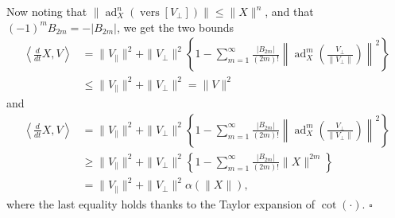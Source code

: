\documentclass[11pt]{article}
\newcommand{\ad}{\operatorname{ad}}
\newcommand{\vers}{\operatorname{vers}}
\newcommand{\proofbox}{\hfill$\square$}
\begin{document}
Now noting that $\|\ad_X^n(\vers[V_{\perp}])\|\leq\|X\|^n$, and that $(-1)^mB_{2m}=-|B_{2m}|$, we get the two bounds
\begin{align*}
\left\langle\frac{d}{dt}X,V\right\rangle
&=\|V_{\parallel}\|^2+\|V_{\perp}\|^2
\left\{1-\sum_{m=1}^{\infty}\frac{|B_{2m}|}{(2m)!}
\left\|\ad_X^m\left(\frac{V_{\perp}}{\|V_{\perp}\|}\right)\right\|^2\right\}\\
&\leq\|V_{\parallel}\|^2+\|V_{\perp}\|^2=\|V\|^2
\end{align*}
and
\begin{align*}
\left\langle\frac{d}{dt}X,V\right\rangle
&=\|V_{\parallel}\|^2+\|V_{\perp}\|^2
\left\{1-\sum_{m=1}^{\infty}\frac{|B_{2m}|}{(2m)!}
\left\|\ad_X^m\left(\frac{V_{\perp}}{\|V_{\perp}\|}\right)\right\|^2\right\}\\
&\geq\|V_{\parallel}\|^2+\|V_{\perp}\|^2
\left\{1-\sum_{m=1}^{\infty}\frac{|B_{2m}|}{(2m)!}\|X\|^{2m}\right\}\\
&=\|V_{\parallel}\|^2+\|V_{\perp}\|^2\alpha(\|X\|),
\end{align*}
where the last equality holds thanks to the Taylor expansion of $\cot(\cdot)$. \proofbox
\end{document}
